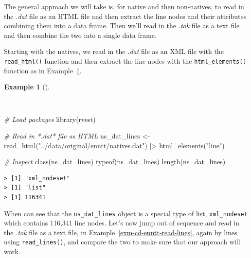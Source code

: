 \documentclass[
  letterpaper,
  DIV=11,
  numbers=noendperiod]{scrreprt}
\newenvironment{Shaded}{\begin{snugshade}}{\end{snugshade}}
\newcommand{\CommentTok}[1]{\textcolor[rgb]{0.00,0.00,0.00}{\textit{#1}}}
\newcommand{\FunctionTok}[1]{\textcolor[rgb]{0.00,0.00,0.00}{#1}}
\newcommand{\NormalTok}[1]{\textcolor[rgb]{0.00,0.00,0.00}{#1}}
\newcommand{\OtherTok}[1]{\textcolor[rgb]{0.00,0.00,0.00}{#1}}
\newcommand{\SpecialCharTok}[1]{\textcolor[rgb]{0.00,0.00,0.00}{#1}}
\newcommand{\StringTok}[1]{\textcolor[rgb]{0.00,0.00,0.00}{#1}}
\theoremstyle{definition}
\newtheorem{example}{Example}[chapter]
\theoremstyle{remark}
\begin{document}
The general approach we will take is, for native and then non-natives,
to read in the \emph{.dat} file as an HTML file and then extract the
line nodes and their attributes combining them into a data frame. Then
we'll read in the \emph{.tok} file as a text file and then combine the
two into a single data frame.

Starting with the natives, we read in the \emph{.dat} file as an XML
file with the \texttt{read\_html()} function and then extract the line
nodes with the \texttt{html\_elements()} function as in
Example~\ref{exm-cd-enntt-read-xml}.

\begin{example}[]\protect\hypertarget{exm-cd-enntt-read-xml}{}\label{exm-cd-enntt-read-xml}

~

\begin{Shaded}
\begin{Highlighting}[]
\CommentTok{\# Load packages}
\FunctionTok{library}\NormalTok{(rvest)}

\CommentTok{\# Read in *.dat* file as HTML}
\NormalTok{ns\_dat\_lines }\OtherTok{\textless{}{-}}
  \FunctionTok{read\_html}\NormalTok{(}\StringTok{"../data/original/enntt/natives.dat"}\NormalTok{) }\SpecialCharTok{|\textgreater{}}
  \FunctionTok{html\_elements}\NormalTok{(}\StringTok{"line"}\NormalTok{)}

\CommentTok{\# Inspect}
\FunctionTok{class}\NormalTok{(ns\_dat\_lines)}
\FunctionTok{typeof}\NormalTok{(ns\_dat\_lines)}
\FunctionTok{length}\NormalTok{(ns\_dat\_lines)}
\end{Highlighting}
\end{Shaded}

\begin{verbatim}
> [1] "xml_nodeset"
> [1] "list"
> [1] 116341
\end{verbatim}

\end{example}

When can see that the \texttt{ns\_dat\_lines} object is a special type
of list, \texttt{xml\_nodeset} which contains 116,341 line nodes. Let's
now jump out of sequence and read in the \emph{.tok} file as a text
file, in Example~\ref{exm-cd-enntt-read-lines}, again by lines using
\texttt{read\_lines()}, and compare the two to make sure that our
approach will work.
\end{document}
